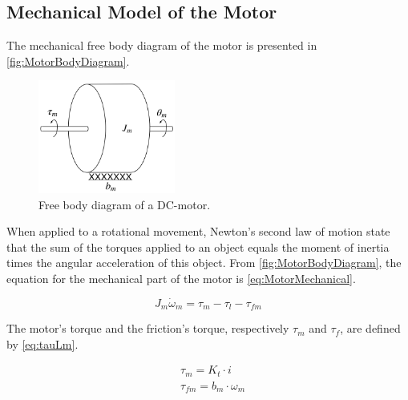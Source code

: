 \subsection*{Mechanical Model of the Motor}
The mechanical free body diagram of the motor is presented in \autoref{fig:MotorBodyDiagram}.

\begin{figure}[htbp]
	\centering
 	\includegraphics[width=0.4\textwidth]{figures/modeling/Motor/DCMotorMechanic.pdf} 
 	\caption{Free body diagram of a DC-motor.}
 	\label{fig:MotorBodyDiagram}
\end{figure}

When applied to a rotational movement, Newton's second law of motion state that the sum of the torques applied to an object equals the moment of inertia times the angular acceleration of this object. From \autoref{fig:MotorBodyDiagram}, the equation for the mechanical part of the motor is \autoref{eq:MotorMechanical}.

\begin{equation}
	J_{m} \dot{\omega}_{m} = \tau_{m} - \tau_{l} - \tau_{fm}
	\label{eq:MotorMechanical}
\end{equation}

\startexplain
\stopexplain

The motor's torque and the friction's torque, respectively $\tau_m$ and $\tau_f$, are defined by \autoref{eq:tauLm}.

\begin{subequations}\label{eq:tauLm}
	\begin{flalign}
		&\tau_m = K_t \cdot i  \label{eq:MotorTorque}\\	
		&\tau_{fm} = b_{m}\cdot\omega_{m}	\label{eq:FrictionTorque}
	\end{flalign}
\end{subequations}

